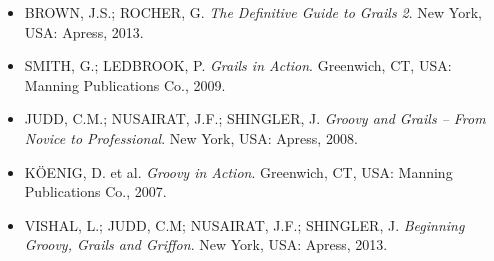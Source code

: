 \begin{itemize}

\vspace{0.5cm}

\item  {BROWN, J.S.; ROCHER,  G. \emph{The  Definitive Guide  to Grails  2}. New
  York, USA: Apress, 2013.} 

\vspace{0.5cm}

\item  {SMITH, G.;  LEDBROOK, P.  \emph{Grails in  Action}. Greenwich,  CT, USA:
  Manning Publications Co., 2009.} 

\vspace{0.5cm}

\item {JUDD, C.M.; NUSAIRAT, J.F.;  SHINGLER, J. \emph{Groovy and Grails -- From
    Novice to Professional}. New York, USA: Apress, 2008.}  

\vspace{0.5cm}

\item  {K{\"O}ENIG, D.  et  al.  \emph{Groovy in  Action}.  Greenwich, CT,  USA:
  Manning Publications Co., 2007.}

\vspace{0.5cm}

\item  {VISHAL, L.;  JUDD,  C.M; NUSAIRAT,  J.F.;  SHINGLER, J.  \emph{Beginning
    Groovy, Grails and Griffon}. New York, USA: Apress, 2013.}

\end{itemize}
